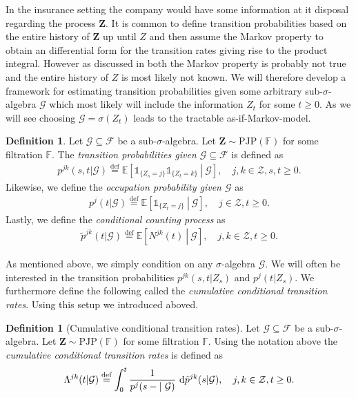 \documentclass[12pt,letter,twoside]{article}
\theoremstyle{plain}
\theoremstyle{definition}
\newtheorem{definition}[theorem]{Definition}
\theoremstyle{remark}
\begin{document}
In the insurance setting the company would have some information at it disposal regarding the process $\mathbf Z$. It is common to define transition probabilities based on the entire history of $\mathbf Z$ up until $Z$ and then assume the Markov property to obtain an differential form for the transition rates giving rise to the product integral. However as discussed in \textit{} both the Markov property is probably not true and the entire history of $Z$ is most likely not known. We will therefore develop a framework for estimating transition probabilities given some arbitrary sub-$\sigma$-algebra $\mathcal G$ which most likely will include the information $Z_t$ for some $t\ge 0$. As we will see choosing $\mathcal G=\sigma (Z_t)$ leads to the tractable as-if-Markov-model.
\begin{definition}\label{def:1}%
Let $\mathcal G\subseteq\mathcal F$ be a sub-$\sigma$-algebra. Let $\mathbf Z\sim \text{PJP}(\mathbb F)$ for some filtration $\mathbb F$. The \textit{transition probabilities given $\mathcal G\subseteq \mathcal F$} is defined as
\begin{align}
p^{jk}(s,t\vert \mathcal G)\stackrel{\text{def}}{=}\mathbb E\left[\left.\mathds 1_{\{Z_s=j\}}\mathds 1_{\{Z_t=k\}} \ \right\vert\ \mathcal G\right],\quad j,k\in\mathcal Z, s,t\ge 0.
\end{align}
Likewise, we define the \textit{occupation probability given $\mathcal G$} as
\begin{align}
p^{j}(t\vert \mathcal G)\stackrel{\text{def}}{=}\mathbb E\left[\left.\mathds 1_{\{Z_t=j\}} \ \right\vert\ \mathcal G\right],\quad j\in\mathcal Z,t\ge 0.
\end{align}
Lastly, we define the \textit{conditional counting process} as
\begin{align}
\tilde p^{jk}(t\vert \mathcal G)\stackrel{\text{def}}{=}\mathbb E\left[\left.N^{jk}(t) \ \right\vert\ \mathcal G\right],\quad j,k\in\mathcal Z, t\ge 0.
\end{align}
\end{definition}
As mentioned above, we simply condition on any $\sigma$-algebra $\mathcal G$. We will often be interested in the transition probabilities $p^{jk}(s,t\vert  Z_s)$ and $p^j(t\vert Z_s)$. We furthermore define the following called the \textit{cumulative conditional transition rates}. Using this setup we introduced aboved.
\begin{definition}[Cumulative conditional transition rates]
Let $\mathcal G\subseteq\mathcal F$ be a sub-$\sigma$-algebra. Let $\mathbf Z\sim \text{PJP}(\mathbb F)$ for some filtration $\mathbb F$. Using the notation above the \textit{cumulative conditional transition rates} is defined as
\begin{align}
\Lambda^{jk}(t\vert \mathcal G)\stackrel{\text{def}}{=} \int_0^t \frac{1}{p^j(s-\vert\ \mathcal G)}\ \text d \tilde p^{jk}(s\vert \mathcal G),\quad j,k\in\mathcal Z, t\ge 0.
\end{align}
\end{definition}
\end{document}
